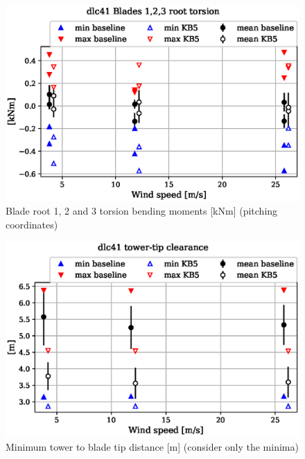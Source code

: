 \begin{figure}[!ht]
\begin{center}
	\includegraphics[width=.85\linewidth]{figures/baseline-vs-KB6/dlc41/blade1-blade1-node-001-momentvec-z_AA0008_AA0008.eps}
\end{center}
\caption{Blade root 1, 2 and 3 torsion bending moments [kNm] (pitching coordinates)}
\label{fig:baseline-vs-KB6:dlc41:blade-root-torsion}
\end{figure}

\begin{figure}[!ht]
\begin{center}
	\includegraphics[width=.85\linewidth]{figures/baseline-vs-KB6/dlc41/DLL-towerclearance_mblade-inpvec-1_AA0008_AA0008.eps}
\end{center}
\caption{Minimum tower to blade tip distance [m] (consider only the minima)}
\label{fig:baseline-vs-KB6:dlc41:tower-tip-clearance}
\end{figure}

